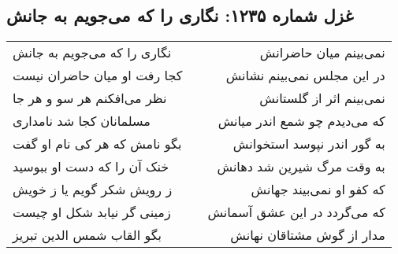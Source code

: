 \begin{center}
\section*{غزل شماره ۱۲۳۵: نگاری را که می‌جویم به جانش}
\label{sec:1235}
\begin{longtable}{l p{0.5cm} r}
نگاری را که می‌جویم به جانش
&&
نمی‌بینم میان حاضرانش
\\
کجا رفت او میان حاضران نیست
&&
در این مجلس نمی‌بینم نشانش
\\
نظر می‌افکنم هر سو و هر جا
&&
نمی‌بینم اثر از گلستانش
\\
مسلمانان کجا شد نامداری
&&
که می‌دیدم چو شمع اندر میانش
\\
بگو نامش که هر کی نام او گفت
&&
به گور اندر نپوسد استخوانش
\\
خنک آن را که دست او ببوسید
&&
به وقت مرگ شیرین شد دهانش
\\
ز رویش شکر گویم یا ز خویش
&&
که کفو او نمی‌بیند جهانش
\\
زمینی گر نیابد شکل او چیست
&&
که می‌گردد در این عشق آسمانش
\\
بگو القاب شمس الدین تبریز
&&
مدار از گوش مشتاقان نهانش
\\
\end{longtable}
\end{center}
